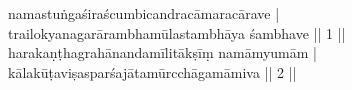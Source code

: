 \documentclass{article}
\begin{document}
namastuṅgaśiraścumbicandracāmaracārave |\\
trailokyanagarārambhamūlastambhāya śambhave || 1 ||\\
harakaṇṭhagrahānandamīlitākṣīṃ namāmyumām |\\
kālakūṭaviṣasparśajātamūrcchāgamāmiva || 2 ||
\end{document}
